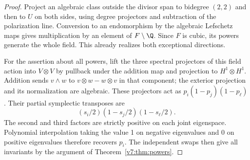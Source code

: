 \begin{proof}
Project an algebraic class outside the divisor span to bidegree \((2,2)\) and then to \(U\) on both sides, using degree projectors and subtraction of the polarization line. Conversion to an endomorphism by the algebraic Lefschetz maps gives multiplication by an element of \(F\setminus\Q\). Since \(F\) is cubic, its powers generate the whole field. This already realizes both exceptional directions.

For the assertion about all powers, lift the three spectral projectors of this field action into \(V\otimes V\) by pullback under the addition map and projection to \(H^1\otimes H^1\). Addition sends \(v\wedge w\) to \(v\otimes w-w\otimes v\) in that component; the exterior projection and its normalization are algebraic. These projectors act as \(p_i(1-p_j)(1-p_\ell)\). Their partial symplectic transposes are
\[
 (s_i/2)(1-s_j/2)(1-s_\ell/2).
\]
The second and third factors are strictly positive on each joint eigenspace. Polynomial interpolation taking the value 1 on negative eigenvalues and 0 on positive eigenvalues therefore recovers \(p_i\). The independent swaps then give all invariants by the argument of Theorem~\ref{v7:thm:powers}.
\end{proof}
